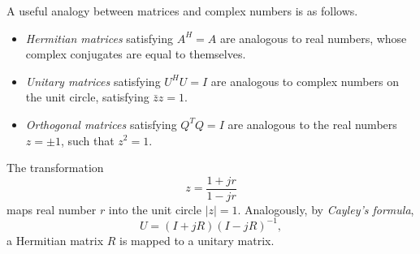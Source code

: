 A useful analogy between matrices and complex numbers is as follows.
\begin{itemize}
\item \emph{Hermitian matrices} satisfying $A^H = A$ are analogous to real numbers, whose complex conjugates are equal to themselves.
\item \emph{Unitary matrices} satisfying $U^H U = I$ are analogous to complex numbers on the unit circle, satisfying $\bar{z}z = 1$.
\item \emph{Orthogonal matrices} satisfying $Q^TQ = I$ are analogous to the real numbers $z = \pm 1$, such that $z^2 = 1$.
\end{itemize}

The transformation
\begin{equation*}
z = \frac{1 + jr}{1 - jr}
\end{equation*}
maps real number $r$ into the unit circle $|z| = 1$.
Analogously, by \emph{Cayley's formula},
\begin{equation*}
U = (I + jR) (I - jR)^{-1},
\end{equation*}
a Hermitian matrix $R$ is mapped to a unitary matrix.



